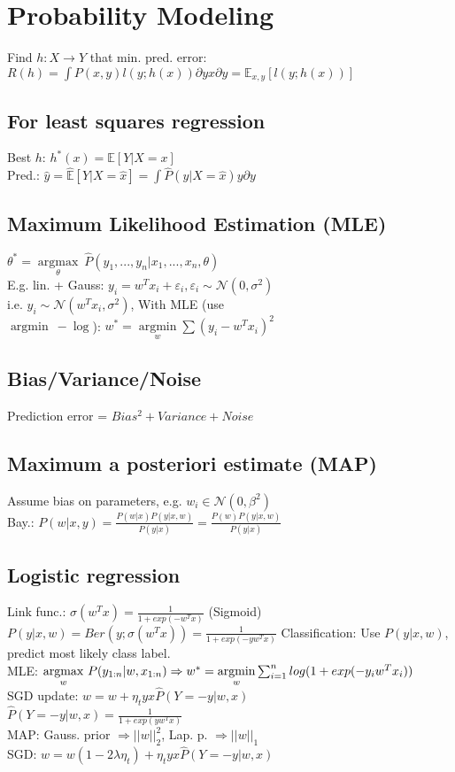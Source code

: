 \section*{Probability Modeling}
Find $h:X\rightarrow Y$ that min. pred. error: 
$R(h) = \int P(x,y)l(y;h(x)) \partial yx \partial y = \mathbb{E}_{x,y}[l(y;h(x))]$

\subsection*{For least squares regression}
Best $h$: $h^*(x) = \mathbb{E}[Y|X=x]$ \\
Pred.: $\hat{y} = \hat{\mathbb{E}}[Y|X=\hat{x}] = \int \hat{P}(y|X=\hat{x}) y \partial y$

\subsection*{Maximum Likelihood Estimation (MLE)}
$\theta^* = \underset{\theta}{\operatorname{argmax}} ~ \hat{P}(y_1,...,y_n|x_1,...,x_n,\theta)$\\
E.g. lin. + Gauss: $y_i = w^T x_i + \varepsilon_i, \varepsilon_i \sim \mathcal{N}(0, \sigma^2)$\\
i.e. $y_i \sim \mathcal{N}(w^T x_i, \sigma^2)$, With MLE (use\\ $\operatorname{argmin} ~ - \operatorname{log}$): $w^* = \underset{w}{\operatorname{argmin}} \sum (y_i-w^Tx_i)^2$

\subsection*{Bias/Variance/Noise}
Prediction error = $Bias^2 + Variance + Noise$

\subsection*{Maximum a posteriori estimate (MAP)}
Assume bias on parameters, e.g. $w_i \in \mathcal{N}(0, \beta^2)$\\
Bay.: $P(w|x,y) = \frac{P(w|x) P(y|x,w)}{P(y|x)} = \frac{P(w) P(y|x,w)}{P(y|x)}$

\subsection*{Logistic regression}
Link func.: $\sigma(w^Tx) = \frac{1}{1+exp(-w^Tx)}$ (Sigmoid)\\
$P(y|x,w) = Ber(y; \sigma(w^Tx)) = \frac{1}{1+exp(-y w^T x)}$
Classification: Use $P(y|x,w)$, predict most likely class label.\\
MLE: $\underset{w}{\operatorname{argmax}} ~ P(y_{1:n}|w,x_{1:n})\\
\Rightarrow w^* = \underset{w}{\operatorname{argmin}} \sum_{i=1}^n log(1+exp(-y_i w^T x_i))$\\
SGD update: $w = w + \eta_t y x \hat{P}(Y = -y|w,x)$\\
$\hat{P}(Y = -y|w,x) = \frac{1}{1+exp(yw^Tx)}$\\
MAP: Gauss. prior $\Rightarrow ||w||_2^2$, Lap. p. $\Rightarrow||w||_1$\\
SGD: $w = w (1-2\lambda \eta_t) + \eta_t y x \hat{P}(Y = -y|w,x)$